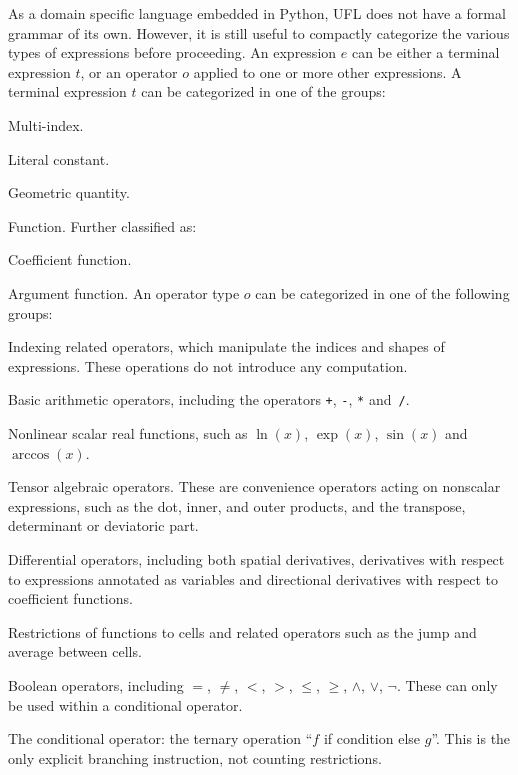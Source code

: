 \documentclass[prodmode,acmtoms]{acmsmall}
\newcommand{\uflc}[1]{\texttt{#1}}
\let\ifbolditem\iffalse
\def\bolditemtrue{\global\let\ifbolditem\iftrue}
\def\bolditemfalse{\global\let\ifbolditem\iffalse}
\newenvironment{benumerate}
  {\def\bolditem{\bolditemtrue\item}\enumerate
   \renewcommand\makelabel[1]{\hss\llap{\ifbolditem\bfseries\fi##1\bolditemfalse}}}
  {\endenumerate}
\begin{document}
As a domain specific language embedded in Python, UFL does not have a
formal grammar of its own. However, it is still useful to compactly
categorize the various types of expressions before proceeding. An
expression $e$ can be either a terminal expression $t$, or an operator
$o$ applied to one or more other expressions. A terminal expression
$t$ can be categorized in one of the groups:
\begin{benumerate}
  \bolditem[$i$] Multi-index.
  \bolditem[$l$] Literal constant.
  \bolditem[$g$] Geometric quantity.
  \bolditem[$f$] Function. Further classified as:
  \begin{benumerate}
    \bolditem[$c$] Coefficient function.
    \bolditem[$a$] Argument function.
  \end{benumerate}
\end{benumerate}
An operator type $o$ can be categorized in one of the following
groups:
\begin{benumerate}
  \bolditem[$I$] Indexing related operators, which manipulate the
  indices and shapes of expressions. These operations do not introduce
  any computation.

  \bolditem[$A$] Basic arithmetic operators, including the operators \uflc{+},
  \uflc{-}, \uflc{*} and~\uflc{/}.

  \bolditem[$F$] Nonlinear scalar real functions, such as $\ln(x)$,
  $\exp(x)$, $\sin(x)$ and~$\arccos(x)$.

  \bolditem[$T$] Tensor algebraic operators. These are convenience
  operators acting on nonscalar expressions, such as the dot, inner,
  and outer products, and the transpose, determinant or deviatoric part.

  \bolditem[$D$] Differential operators, including both spatial
  derivatives, derivatives with respect to expressions annotated as
  variables and directional derivatives with respect to coefficient
  functions.

  \bolditem[$R$] Restrictions of functions to cells and related operators
  such as the jump and average between cells.

  \bolditem[$B$] Boolean operators, including $=$, $\ne$, $<$, $>$,
  $\le$, $\ge$, $\land$, $\lor$, $\lnot$. These can only be used within
  a conditional operator.

  \bolditem[$C$] The conditional operator: the ternary operation ``$f$ if
  condition else $g$''. This is the only explicit branching instruction,
  not counting restrictions.

\end{benumerate}
\end{document}
